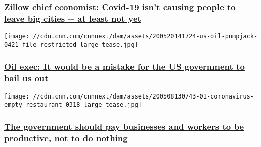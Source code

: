 \hypertarget{zillow-chief-economist-covid-19-isnt-causing-people-to-leave-big-cities----at-least-not-yet}{%
\subsubsection{\texorpdfstring{\href{/2020/05/22/perspectives/homeowners-renters-cities-zillow-coronavirus/index.html}{Zillow
chief economist: Covid-19 isn't causing people to leave big cities -\/-
at least not
yet}}{Zillow chief economist: Covid-19 isn't causing people to leave big cities -\/- at least not yet}}\label{zillow-chief-economist-covid-19-isnt-causing-people-to-leave-big-cities----at-least-not-yet}}

\href{/2020/05/21/perspectives/oil-industry-bailout/index.html}{}

\texttt{[image: //cdn.cnn.com/cnnnext/dam/assets/200520141724-us-oil-pumpjack-0421-file-restricted-large-tease.jpg]}

\hypertarget{oil-exec-it-would-be-a-mistake-for-the-us-government-to-bail-us-out}{%
\subsubsection{\texorpdfstring{\href{/2020/05/21/perspectives/oil-industry-bailout/index.html}{Oil
exec: It would be a mistake for the US government to bail us
out}}{Oil exec: It would be a mistake for the US government to bail us out}}\label{oil-exec-it-would-be-a-mistake-for-the-us-government-to-bail-us-out}}

\href{/2020/05/20/perspectives/coronavirus-stimulus-business-workers/index.html}{}

\texttt{[image: //cdn.cnn.com/cnnnext/dam/assets/200508130743-01-coronavirus-empty-restaurant-0318-large-tease.jpg]}

\hypertarget{the-government-should-pay-businesses-and-workers-to-be-productive-not-to-do-nothing}{%
\subsubsection{\texorpdfstring{\href{/2020/05/20/perspectives/coronavirus-stimulus-business-workers/index.html}{The
government should pay businesses and workers to be productive, not to do
nothing}}{The government should pay businesses and workers to be productive, not to do nothing}}\label{the-government-should-pay-businesses-and-workers-to-be-productive-not-to-do-nothing}}

\href{/2020/05/19/perspectives/minority-owned-businesses-ppp-loans/index.html}{}

